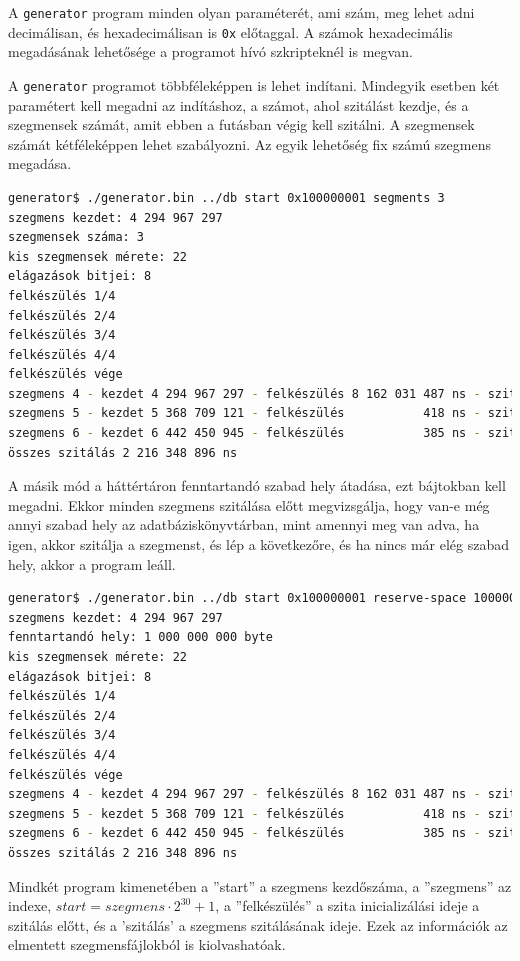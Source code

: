 A \texttt{generator} program minden olyan paraméterét, ami szám, meg lehet adni decimálisan, és hexadecimálisan is \texttt{0x} előtaggal.
A számok hexadecimális megadásának lehetősége a  programot hívó szkripteknél is megvan.

A \texttt{generator} programot többféleképpen is lehet indítani.
Mindegyik esetben két paramétert kell megadni az indításhoz, a számot, ahol szitálást kezdje, és a szegmensek számát, amit ebben a futásban végig kell szitálni.
A szegmensek számát kétféleképpen lehet szabályozni.
Az egyik lehetőség fix számú szegmens megadása.

\begin{lstlisting}[language=bash]
generator$ ./generator.bin ../db start 0x100000001 segments 3
szegmens kezdet: 4 294 967 297
szegmensek száma: 3
kis szegmensek mérete: 22
elágazások bitjei: 8
felkészülés 1/4
felkészülés 2/4
felkészülés 3/4
felkészülés 4/4
felkészülés vége
szegmens 4 - kezdet 4 294 967 297 - felkészülés 8 162 031 487 ns - szitálás 729 914 370 ns
szegmens 5 - kezdet 5 368 709 121 - felkészülés           418 ns - szitálás 736 412 117 ns
szegmens 6 - kezdet 6 442 450 945 - felkészülés           385 ns - szitálás 750 022 409 ns
összes szitálás 2 216 348 896 ns
\end{lstlisting}

A másik mód a háttértáron fenntartandó szabad hely átadása, ezt bájtokban kell megadni.
Ekkor minden szegmens szitálása előtt megvizsgálja, hogy van-e még annyi szabad hely az adatbáziskönyvtárban, mint amennyi meg van adva, ha igen, akkor szitálja a szegmenst,
és lép a következőre, és ha nincs már elég szabad hely, akkor a program leáll.

\begin{lstlisting}[language=bash]
generator$ ./generator.bin ../db start 0x100000001 reserve-space 1000000000
szegmens kezdet: 4 294 967 297
fenntartandó hely: 1 000 000 000 byte 
kis szegmensek mérete: 22
elágazások bitjei: 8
felkészülés 1/4
felkészülés 2/4
felkészülés 3/4
felkészülés 4/4
felkészülés vége
szegmens 4 - kezdet 4 294 967 297 - felkészülés 8 162 031 487 ns - szitálás 729 914 370 ns
szegmens 5 - kezdet 5 368 709 121 - felkészülés           418 ns - szitálás 736 412 117 ns
szegmens 6 - kezdet 6 442 450 945 - felkészülés           385 ns - szitálás 750 022 409 ns
összes szitálás 2 216 348 896 ns
\end{lstlisting}

Mindkét program kimenetében a ''start'' a szegmens kezdőszáma, a ''szegmens'' az indexe,
$start=szegmens \cdot 2^{30}+1$, a ''felkészülés'' a szita inicializálási ideje a szitálás előtt,
és a 'szitálás' a szegmens szitálásának ideje.
Ezek az információk az elmentett szegmensfájlokból is kiolvashatóak.

